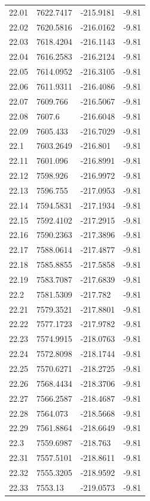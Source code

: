 \begin{table}[H]
\begin{tabular}{llll}
22.01 & 7622.7417 & -215.9181 & -9.81 \\
22.02 & 7620.5816 & -216.0162 & -9.81 \\
22.03 & 7618.4204 & -216.1143 & -9.81 \\
22.04 & 7616.2583 & -216.2124 & -9.81 \\
22.05 & 7614.0952 & -216.3105 & -9.81 \\
22.06 & 7611.9311 & -216.4086 & -9.81 \\
22.07 & 7609.766 & -216.5067 & -9.81 \\
22.08 & 7607.6 & -216.6048 & -9.81 \\
22.09 & 7605.433 & -216.7029 & -9.81 \\
22.1 & 7603.2649 & -216.801 & -9.81 \\
22.11 & 7601.096 & -216.8991 & -9.81 \\
22.12 & 7598.926 & -216.9972 & -9.81 \\
22.13 & 7596.755 & -217.0953 & -9.81 \\
22.14 & 7594.5831 & -217.1934 & -9.81 \\
22.15 & 7592.4102 & -217.2915 & -9.81 \\
22.16 & 7590.2363 & -217.3896 & -9.81 \\
22.17 & 7588.0614 & -217.4877 & -9.81 \\
22.18 & 7585.8855 & -217.5858 & -9.81 \\
22.19 & 7583.7087 & -217.6839 & -9.81 \\
22.2 & 7581.5309 & -217.782 & -9.81 \\
22.21 & 7579.3521 & -217.8801 & -9.81 \\
22.22 & 7577.1723 & -217.9782 & -9.81 \\
22.23 & 7574.9915 & -218.0763 & -9.81 \\
22.24 & 7572.8098 & -218.1744 & -9.81 \\
22.25 & 7570.6271 & -218.2725 & -9.81 \\
22.26 & 7568.4434 & -218.3706 & -9.81 \\
22.27 & 7566.2587 & -218.4687 & -9.81 \\
22.28 & 7564.073 & -218.5668 & -9.81 \\
22.29 & 7561.8864 & -218.6649 & -9.81 \\
22.3 & 7559.6987 & -218.763 & -9.81 \\
22.31 & 7557.5101 & -218.8611 & -9.81 \\
22.32 & 7555.3205 & -218.9592 & -9.81 \\
22.33 & 7553.13 & -219.0573 & -9.81 \\

\end{tabular}
\end{table}

